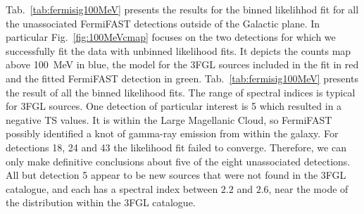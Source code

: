 \documentclass[useAMS,usenatbib]{mn2e}
\begin{document}
Tab.~\ref{tab:fermisig100MeV} presents the results for the binned
likelihhod fit for all the unassociated FermiFAST detections outside of
the Galactic plane.  In particular Fig.~\ref{fig:100MeVcmap} focuses
on the two detections for which we successfully fit the data with
unbinned likelihood fits.  It depicts the counts map above 100~MeV in
blue, the model for the 3FGL sources included in the fit in red and
the fitted FermiFAST detection in green.  Tab.~\ref{tab:fermisig100MeV}
presents the result of all the binned likelihood fits.  The range of
spectral indices is typical for 3FGL sources. One detection of
particular interest is 5 which resulted in a negative TS values.  It
is within the Large Magellanic Cloud, so FermiFAST possibly identified
a knot of gamma-ray emission from within the galaxy.  For detections
18, 24 and 43 the likelihood fit failed to converge.  Therefore, we
can only make definitive conclusions about five of the eight
unassociated detections.  All but detection 5 appear to be new sources
that were not found in the 3FGL catalogue, and each has a spectral index between
$2.2$ and $2.6$, near the mode of the distribution within the 3FGL catalogue.
\end{document}
